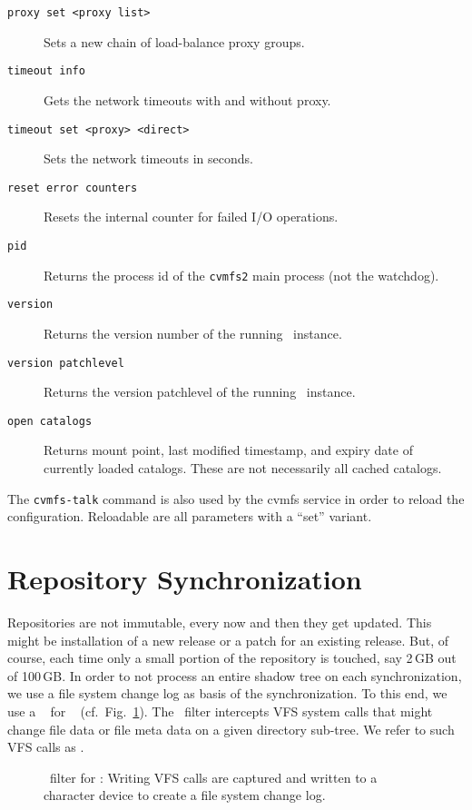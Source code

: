 \begin{description}
	\item[\tt proxy set <proxy list>] Sets a new chain of load-balance proxy groups.
	\item[\tt timeout info] Gets the network timeouts with and without proxy.
	\item[\tt timeout set <proxy> <direct>] Sets the network timeouts in seconds.
	\item[\tt reset error counters] Resets the internal counter for failed I/O operations.
	\item[\tt pid] Returns the process id of the \texttt{cvmfs2} main process (not the watchdog).
	\item[\tt version] Returns the version number of the running \cvmfs\ instance.
	\item[\tt version patchlevel] Returns the version patchlevel of the running \cvmfs\ instance.
	\item[\tt open catalogs] Returns mount point, last modified timestamp, and expiry date of currently loaded catalogs.  These are not necessarily all cached catalogs.
\end{description}

The \texttt{cvmfs-talk} command is also used by the cvmfs service in order to reload the configuration.
Reloadable are all parameters with a ``set'' variant.

\section{Repository Synchronization}

Repositories are not immutable, every now and then they get updated. 
This might be installation of a new release or a patch for an existing release.  
But, of course, each time only a small portion of the repository is touched, say 2\,GB out of 100\,GB.
In order to not process an entire shadow tree on each synchronization, we use a file system change log as basis of the synchronization.
To this end, we use a \cvmfs\  for \redirfs~\cite{redirfs05} (cf.~Fig.~\ref{fig:cvmfsflt}).
The \cvmfs\ filter intercepts VFS system calls that might change file data or file meta data on a given directory sub-tree.
We refer to such VFS calls as .

\begin{figure}
	\begin{center}
		
	\end{center}
	\caption{\cvmfs\ filter for \redirfs: Writing VFS calls are captured and written to a character device to create a file system change log.}
	\label{fig:cvmfsflt}
\end{figure}

